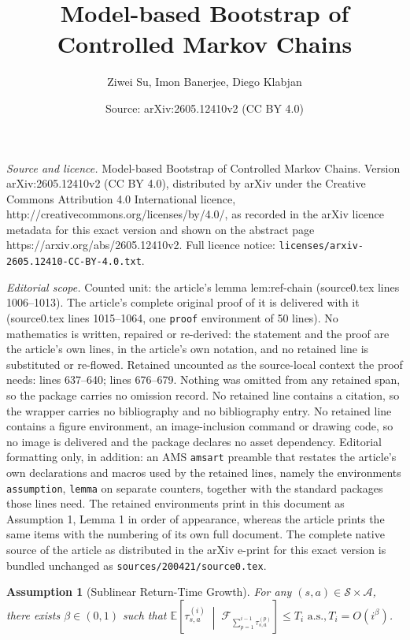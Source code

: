 \documentclass[10pt,a4paper]{amsart}
\title{Model-based Bootstrap of Controlled Markov Chains}
\author{Ziwei Su, Imon Banerjee, Diego Klabjan}
\date{Source: arXiv:2605.12410v2 (CC BY 4.0)}
\newtheorem{assumption}{Assumption}
\newcommand{\pow}[1]{^{(#1)}}
\begin{document}
\maketitle

\noindent\emph{Source and licence.} Model-based Bootstrap of Controlled Markov Chains. Version arXiv:2605.12410v2 (CC BY 4.0), distributed by arXiv under the Creative Commons Attribution 4.0 International licence, http://creativecommons.org/licenses/by/4.0/, as recorded in the arXiv licence metadata for this exact version and shown on the abstract page https://arxiv.org/abs/2605.12410v2. Full licence notice: \texttt{licenses/arxiv-2605.12410-CC-BY-4.0.txt}.\par\smallskip

\noindent\textit{Editorial scope.} Counted unit: the article's lemma lem:ref-chain (source0.tex lines 1006--1013). The article's complete original proof of it is delivered with it (source0.tex lines 1015--1064, one \texttt{proof} environment of 50 lines). No mathematics is written, repaired or re-derived: the statement and the proof are the article's own lines, in the article's own notation, and no retained line is substituted or re-flowed.  Retained uncounted as the source-local context the proof needs: lines 637--640; lines 676--679.  Nothing was omitted from any retained span, so the package carries no omission record.  No retained line contains a citation, so the wrapper carries no bibliography and no bibliography entry.  No retained line contains a figure environment, an image-inclusion command or drawing code, so no image is delivered and the package declares no asset dependency.  Editorial formatting only, in addition: an AMS \texttt{amsart} preamble that restates the article's own declarations and macros used by the retained lines, namely the environments \texttt{assumption}, \texttt{lemma} on separate counters, together with the standard packages those lines need.  The retained environments print in this document as Assumption 1, Lemma 1 in order of appearance, whereas the article prints the same items with the numbering of its own full document.  The complete native source of the article as distributed in the arXiv e-print for this exact version is bundled unchanged as \texttt{sources/200421/source0.tex}.
\begin{assumption}[Sublinear Return-Time Growth]
\label{ass:return-time-growth}
For any $(s,a)\in\mathcal{S}\times\mathcal{A}$, there exists $\beta\in(0,1)$ such that $\mathbb{E}\!\left[\tau_{s,a}\pow{i}\;\middle|\;\mathcal{F}_{\sum_{p=1}^{i-1}\tau_{s,a}\pow{p}}\right] \le T_i \, \, \text{a.s.}, T_i = O(i^\beta)$.
\end{assumption}
\end{document}
